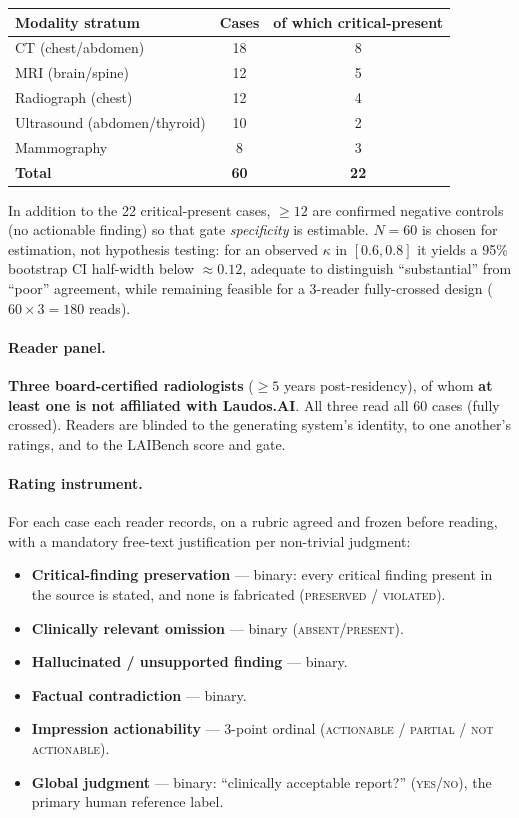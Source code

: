 \documentclass[11pt]{article}
\begin{document}
\begin{center}
\begin{tabular}{lcc}
\toprule
Modality stratum & Cases & of which critical-present \\
\midrule
CT (chest/abdomen) & 18 & 8 \\
MRI (brain/spine)  & 12 & 5 \\
Radiograph (chest) & 12 & 4 \\
Ultrasound (abdomen/thyroid) & 10 & 2 \\
Mammography & 8 & 3 \\
\midrule
\textbf{Total} & \textbf{60} & \textbf{22} \\
\bottomrule
\end{tabular}
\end{center}

\noindent In addition to the 22 critical-present cases, $\geq 12$ are confirmed negative controls (no actionable finding) so that gate \emph{specificity} is estimable. $N=60$ is chosen for estimation, not hypothesis testing: for an observed $\kappa$ in $[0.6,0.8]$ it yields a 95\% bootstrap CI half-width below $\approx 0.12$, adequate to distinguish ``substantial'' from ``poor'' agreement, while remaining feasible for a 3-reader fully-crossed design ($60\times3=180$ reads).

\paragraph{Reader panel.} \textbf{Three board-certified radiologists} ($\geq 5$ years post-residency), of whom \textbf{at least one is not affiliated with Laudos.AI}. All three read all 60 cases (fully crossed). Readers are blinded to the generating system's identity, to one another's ratings, and to the LAIBench score and gate.

\paragraph{Rating instrument.} For each case each reader records, on a rubric agreed and frozen before reading, with a mandatory free-text justification per non-trivial judgment:
\begin{itemize}[leftmargin=*,nosep]
\item \textbf{Critical-finding preservation} --- binary: every critical finding present in the source is stated, and none is fabricated (\textsc{preserved} / \textsc{violated}).
\item \textbf{Clinically relevant omission} --- binary (\textsc{absent}/\textsc{present}).
\item \textbf{Hallucinated / unsupported finding} --- binary.
\item \textbf{Factual contradiction} --- binary.
\item \textbf{Impression actionability} --- 3-point ordinal (\textsc{actionable} / \textsc{partial} / \textsc{not actionable}).
\item \textbf{Global judgment} --- binary: ``clinically acceptable report?'' (\textsc{yes}/\textsc{no}), the primary human reference label.
\end{itemize}
\end{document}
